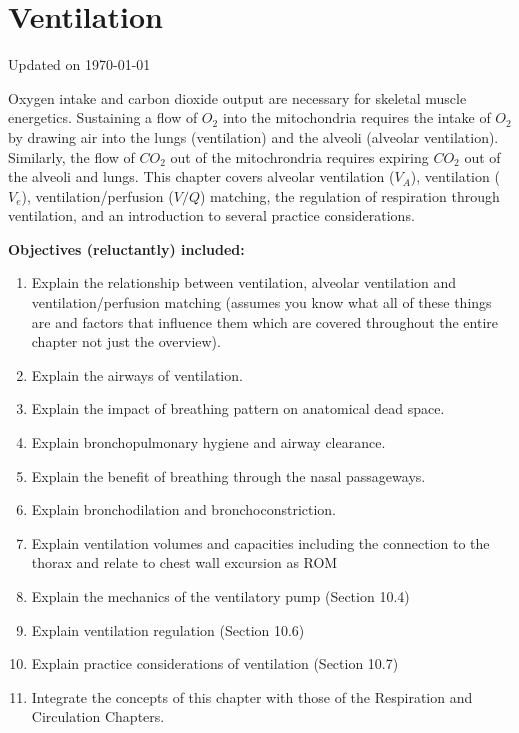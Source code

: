 \chapter{Ventilation}\label{chp:alveolar_oxygen}
Updated on \today
\minitoc

Oxygen intake and carbon dioxide output are necessary for skeletal muscle energetics. Sustaining a flow of $O_2$ into the mitochondria requires the intake of $O_2$ by drawing air into the lungs (ventilation) and the alveoli (alveolar ventilation). Similarly, the flow of $CO_2$ out of the mitochrondria requires expiring $CO_2$ out of the alveoli and lungs. This chapter covers alveolar ventilation ($V_A$), ventilation ($V_e$), ventilation/perfusion ($V/Q$) matching, the regulation of respiration through ventilation, and an introduction to several practice considerations.

\vspace{5mm}

\textbf{Objectives (reluctantly) included:}
\begin{enumerate}
    \item Explain the relationship between ventilation, alveolar ventilation and ventilation/perfusion matching (assumes you know what all of these things are and factors that influence them which are covered throughout the entire chapter not just the overview).
    \item Explain the airways of ventilation.
    \item Explain the impact of breathing pattern on anatomical dead space.
    \item Explain bronchopulmonary hygiene and airway clearance.
    \item Explain the benefit of breathing through the nasal passageways.
    \item Explain bronchodilation and bronchoconstriction.
    \item Explain ventilation volumes and capacities including the connection to the thorax and relate to chest wall excursion as ROM
    \item Explain the mechanics of the ventilatory pump (Section 10.4)
    \item Explain ventilation regulation (Section 10.6)
    \item Explain practice considerations of ventilation (Section 10.7)
    \item Integrate the concepts of this chapter with those of the Respiration and Circulation Chapters.
\end{enumerate}

